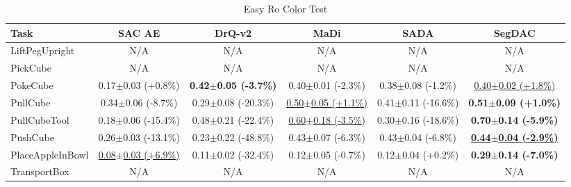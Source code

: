 \begin{table}[htbp]
\centering
\scriptsize
\caption{Easy Ro Color Test}
\label{tab:appendix_rocolortest_easy}
\begin{adjustbox}{max width=\textwidth}
\begin{tabular}{l*{5}{c}}
\toprule
\textbf{Task} & \textbf{SAC AE} & \textbf{DrQ-v2} & \textbf{MaDi} & \textbf{SADA} & \textbf{SegDAC} \\
\midrule
LiftPegUpright & N/A & N/A & N/A & N/A & N/A \\
PickCube & N/A & N/A & N/A & N/A & N/A \\
PokeCube & 0.17$\pm$0.03 \scriptsize{(+0.8\%)} & \textbf{0.42$\pm$0.05 \scriptsize{(-3.7\%)}} & 0.40$\pm$0.01 \scriptsize{(-2.3\%)} & 0.38$\pm$0.08 \scriptsize{(-1.2\%)} & \underline{0.40$\pm$0.02 \scriptsize{(+1.8\%)}} \\
PullCube & 0.34$\pm$0.06 \scriptsize{(-8.7\%)} & 0.29$\pm$0.08 \scriptsize{(-20.3\%)} & \underline{0.50$\pm$0.05 \scriptsize{(+1.1\%)}} & 0.41$\pm$0.11 \scriptsize{(-16.6\%)} & \textbf{0.51$\pm$0.09 \scriptsize{(+1.0\%)}} \\
PullCubeTool & 0.18$\pm$0.06 \scriptsize{(-15.4\%)} & 0.48$\pm$0.21 \scriptsize{(-22.4\%)} & \underline{0.60$\pm$0.18 \scriptsize{(-3.5\%)}} & 0.30$\pm$0.16 \scriptsize{(-18.6\%)} & \textbf{0.70$\pm$0.14 \scriptsize{(-5.9\%)}} \\
PushCube & 0.26$\pm$0.03 \scriptsize{(-13.1\%)} & 0.23$\pm$0.22 \scriptsize{(-48.8\%)} & 0.43$\pm$0.07 \scriptsize{(-6.3\%)} & 0.43$\pm$0.04 \scriptsize{(-6.8\%)} & \textbf{\underline{0.44$\pm$0.04 \scriptsize{(-2.9\%)}}} \\
PlaceAppleInBowl & \underline{0.08$\pm$0.03 \scriptsize{(+6.9\%)}} & 0.11$\pm$0.02 \scriptsize{(-32.4\%)} & 0.12$\pm$0.05 \scriptsize{(-0.7\%)} & 0.12$\pm$0.04 \scriptsize{(+0.2\%)} & \textbf{0.29$\pm$0.14 \scriptsize{(-7.0\%)}} \\
TransportBox & N/A & N/A & N/A & N/A & N/A \\
\bottomrule
\end{tabular}
\end{adjustbox}
\end{table}

